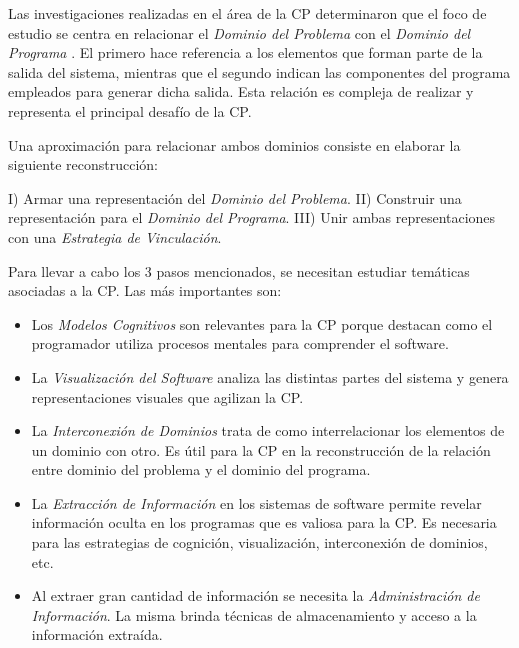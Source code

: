 \documentclass[a4paper,12pt]{report}
\begin{document}
Las investigaciones realizadas en el área de la CP determinaron que el foco de estudio se centra en relacionar el \textit{Dominio del Problema} con el \textit{Dominio del Programa} \cite{BRM10,MPMR07,MBPHRU10,DWE04}. El primero hace referencia a los elementos que forman parte de la salida del sistema, mientras que el segundo indican las componentes del programa empleados para generar dicha salida.
Esta relación es compleja de realizar y representa el principal desafío de la CP. 

Una aproximación para relacionar ambos dominios consiste en elaborar la siguiente reconstrucción:

I) Armar una representación del \textit{Dominio del Problema}. II) Construir una representación para el \textit{Dominio del Programa}. III) Unir ambas representaciones con una \textit{Estrategia de Vinculación}.

Para llevar a cabo los 3 pasos mencionados, se necesitan estudiar temáticas asociadas a la CP. Las más importantes son:

\begin{itemize}
\itemsep0em%
\item Los \textit{Modelos Cognitivos} son relevantes para la CP porque destacan como el programador utiliza procesos mentales para comprender el software.

\item La \textit{Visualización del Software} analiza las distintas partes del sistema y genera representaciones visuales que agilizan la CP.

\item La \textit{Interconexión de Dominios} trata de como interrelacionar los elementos de un dominio con otro. Es útil para la CP en la reconstrucción de la relación entre dominio del problema y el dominio del programa.

\item La \textit{Extracción de Información} en los sistemas de software permite revelar información oculta en los programas que es valiosa para la CP. Es necesaria para las estrategias de cognición, visualización, interconexión de dominios, etc.

\item Al extraer gran cantidad de información se necesita la \textit{Administración de Información}. La misma brinda técnicas de almacenamiento y acceso a la información extraída.

\end{itemize}
\end{document}

